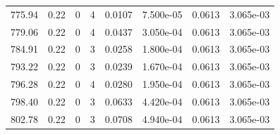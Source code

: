\documentclass[preview]{standalone}
\begin{document}
{{{{{\begin{tabular}{L{1.2cm}C{1.2cm} C{0.3cm}C{0.5cm} C{1.4cm}C{1.4cm} C{1.4cm}C{1.4cm}}
  775.94  &  0.22  & 0     &  4 &  0.0107  & 7.500e-05  & 0.0613 &  3.065e-03   \\ 
  779.06  &  0.22  & 0     &  4 &  0.0437  & 3.050e-04  & 0.0613 &  3.065e-03   \\ 
  784.91  &  0.22  & 0     &  3 &  0.0258  & 1.800e-04  & 0.0613 &  3.065e-03   \\ 
  793.22  &  0.22  & 0     &  3 &  0.0239  & 1.670e-04  & 0.0613 &  3.065e-03   \\ 
  796.28  &  0.22  & 0     &  4 &  0.0280  & 1.950e-04  & 0.0613 &  3.065e-03   \\ 
  798.40  &  0.22  & 0     &  3 &  0.0633  & 4.420e-04  & 0.0613 &  3.065e-03   \\ 
  802.78  &  0.22  & 0     &  3 &  0.0708  & 4.940e-04  & 0.0613 &  3.065e-03   \\ 
\hline 
\end{tabular} 

}}}}}
\end{document}
